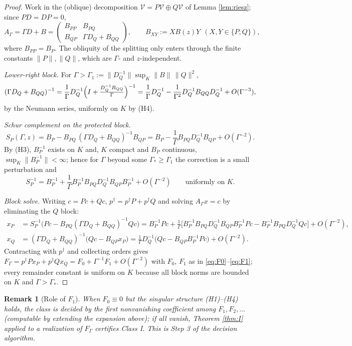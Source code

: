\documentclass[11pt]{article}
\newtheorem{remark}{Remark}
\begin{document}
\begin{proof}
Work in the (oblique) decomposition $\mathcal V=P\mathcal V\oplus Q\mathcal V$
of Lemma \ref{lem:riesz}; since $PD=DP=0$,
\[
A_\Gamma=\Gamma D+B=
\begin{pmatrix}B_{PP}&B_{PQ}\\ B_{QP}&\Gamma D_Q+B_{QQ}\end{pmatrix},
\qquad
B_{XY}:=XB(z)Y \ \ (X,Y\in\{P,Q\}),
\]
where $B_{PP}=B_P$. The obliquity of the splitting only enters through the
finite constants $\|P\|,\|Q\|$, which are $\Gamma$- and $z$-independent.

\emph{Lower-right block.} For
$\Gamma>\Gamma_1:=\|D_Q^{-1}\|\sup_K\|B\|\,\|Q\|^2$,
\[
(\Gamma D_Q+B_{QQ})^{-1}
=\frac1\Gamma D_Q^{-1}\Bigl(I+\tfrac{D_Q^{-1}B_{QQ}}{\Gamma}\Bigr)^{-1}
=\frac1\Gamma D_Q^{-1}-\frac1{\Gamma^2}D_Q^{-1}B_{QQ}D_Q^{-1}
 +O(\Gamma^{-3}),
\]
by the Neumann series, uniformly on $K$ by (H4).

\emph{Schur complement on the protected block.}
\[
S_P(\Gamma,z)=B_P-B_{PQ}\,(\Gamma D_Q+B_{QQ})^{-1}B_{QP}
=B_P-\frac1\Gamma B_{PQ}D_Q^{-1}B_{QP}+O(\Gamma^{-2}).
\]
By (H3), $B_P^{-1}$ exists on $K$ and, $K$ compact and $B_P$ continuous,
$\sup_K\|B_P^{-1}\|<\infty$; hence for $\Gamma$ beyond some $\Gamma_*\ge\Gamma_1$
the correction is a small perturbation and
\[
S_P^{-1}=B_P^{-1}
 +\frac1\Gamma B_P^{-1}B_{PQ}D_Q^{-1}B_{QP}B_P^{-1}
 +O(\Gamma^{-2})
\qquad\text{uniformly on }K .
\]

\emph{Block solve.} Writing $c=Pc+Qc$, $p^\dagger=p^\dagger P+p^\dagger Q$ and
solving $A_\Gamma x=c$ by eliminating the $Q$ block:
\begin{align*}
x_P&=S_P^{-1}\bigl(Pc-B_{PQ}(\Gamma D_Q+B_{QQ})^{-1}Qc\bigr)
   =B_P^{-1}Pc
   +\tfrac1\Gamma\bigl[B_P^{-1}B_{PQ}D_Q^{-1}B_{QP}B_P^{-1}Pc
   -B_P^{-1}B_{PQ}D_Q^{-1}Qc\bigr]+O(\Gamma^{-2}),\\
x_Q&=(\Gamma D_Q+B_{QQ})^{-1}\bigl(Qc-B_{QP}x_P\bigr)
   =\tfrac1\Gamma D_Q^{-1}\bigl(Qc-B_{QP}B_P^{-1}Pc\bigr)+O(\Gamma^{-2}).
\end{align*}
Contracting with $p^\dagger$ and collecting orders gives
$F_\Gamma=p^\dagger Px_P+p^\dagger Qx_Q
=F_0+\Gamma^{-1}F_1+O(\Gamma^{-2})$ with $F_0$, $F_1$ as in
\eqref{eq:F0}--\eqref{eq:F1}; every remainder constant is uniform on $K$
because all block norms are bounded on $K$ and $\Gamma>\Gamma_*$.
\end{proof}

\begin{remark}[Role of $F_1$]
When $F_0\equiv0$ but the singular structure (H1)--(H4) holds, the class is
decided by the first nonvanishing coefficient among $F_1,F_2,\dots$
(computable by extending the expansion above); if all vanish, Theorem
\ref{thm:I} applied to a realization of $F_\Gamma$ certifies Class I. This is
Step 3 of the decision algorithm.
\end{remark}
\end{document}
